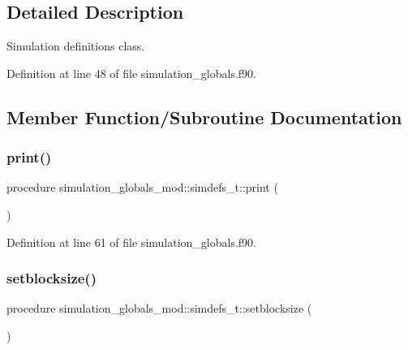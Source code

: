 \subsection{Detailed Description}
Simulation definitions class. 

Definition at line 48 of file simulation\+\_\+globals.\+f90.



\subsection{Member Function/\+Subroutine Documentation}
\mbox{\label{structsimulation__globals__mod_1_1simdefs__t_a135110b50bcbd621d80df8f7b31fa60e}} 
\subsubsection{\texorpdfstring{print()}{print()}}
{\footnotesize\ttfamily procedure simulation\+\_\+globals\+\_\+mod\+::simdefs\+\_\+t\+::print (\begin{DoxyParamCaption}{ }\end{DoxyParamCaption})\hspace{0.3cm}{\ttfamily [private]}}



Definition at line 61 of file simulation\+\_\+globals.\+f90.

\mbox{\label{structsimulation__globals__mod_1_1simdefs__t_ae55e67ff6ecd7045526f099a4bb77fac}} 
\subsubsection{\texorpdfstring{setblocksize()}{setblocksize()}}
{\footnotesize\ttfamily procedure simulation\+\_\+globals\+\_\+mod\+::simdefs\+\_\+t\+::setblocksize (\begin{DoxyParamCaption}{ }\end{DoxyParamCaption})\hspace{0.3cm}{\ttfamily [private]}}



